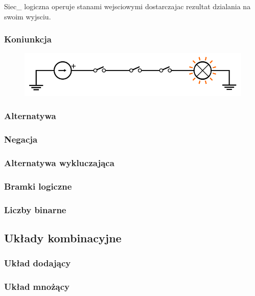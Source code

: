 \documentclass[a4paper,12pt]{article}
\begin{document}
Siec_ logiczna operuje stanami wejsciowymi dostarczajac rezultat dzialania na swoim wyjsciu.

\subsubsection{Koniunkcja}

\begin{figure}[htb]
   \centering
   \includegraphics[width=15cm]{grafika/obwody/and.png}
\end{figure}

\subsubsection{Alternatywa}

\subsubsection{Negacja}

\subsubsection{Alternatywa wykluczająca}

\subsubsection{Bramki logiczne}

\subsubsection{Liczby binarne}

\subsection{Układy kombinacyjne}

\subsubsection{Układ dodający}

\subsubsection{Układ mnożący}
\end{document}

